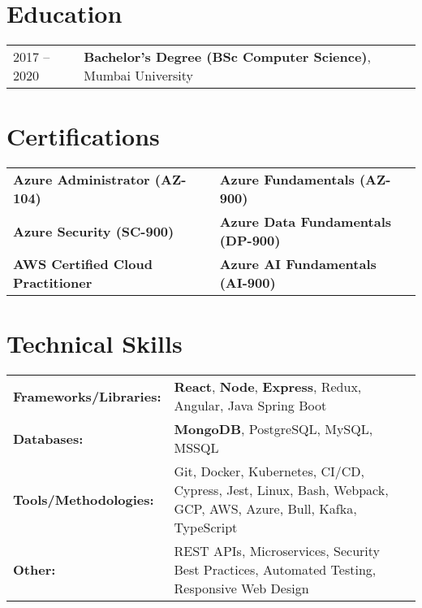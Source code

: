 \documentclass[a4paper,8pt]{extarticle}  %
\begin{document}
\section{Education}
\begin{tabularx}{\linewidth}{@{}l X@{}}
2017 -- 2020 & \textbf{Bachelor's Degree (BSc Computer Science)}, Mumbai University \\
\end{tabularx}

\section{Certifications}
\begin{tabularx}{\linewidth}{@{}l X l@{}}
\textbf{Azure Administrator (AZ-104)} & & \textbf{Azure Fundamentals (AZ-900)} \\
\textbf{Azure Security (SC-900)} & & \textbf{Azure Data Fundamentals (DP-900)} \\
\textbf{AWS Certified Cloud Practitioner} & & \textbf{Azure AI Fundamentals (AI-900)} \\
\end{tabularx}

\section{Technical Skills}
\begin{tabularx}{\linewidth}{@{}l X@{}}
\textbf{Frameworks/Libraries:} & \textbf{React}, \textbf{Node}, \textbf{Express}, Redux, Angular, Java Spring Boot \\
\textbf{Databases:} & \textbf{MongoDB}, PostgreSQL, MySQL, MSSQL \\
\textbf{Tools/Methodologies:} & Git, Docker, Kubernetes, CI/CD, Cypress, Jest, Linux, Bash, Webpack, GCP, AWS, Azure, Bull, Kafka, TypeScript \\
\textbf{Other:} & REST APIs, Microservices, Security Best Practices, Automated Testing, Responsive Web Design \\
\end{tabularx}

\vfill
\end{document}
